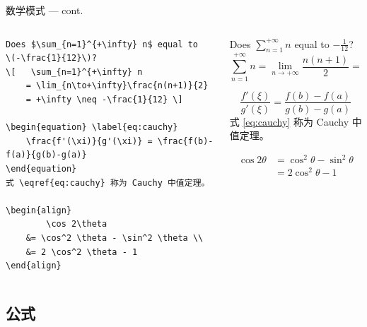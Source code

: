 \begin{frame}[fragile]{数学模式 --- cont.} \label{math-examples}
  \begin{columns}
      \begin{column}{0.5\textwidth}
          \begin{verbatim}
Does $\sum_{n=1}^{+\infty} n$ equal to
\(-\frac{1}{12}\)?
\[   \sum_{n=1}^{+\infty} n
    = \lim_{n\to+\infty}\frac{n(n+1)}{2}
    = +\infty \neq -\frac{1}{12} \]

\begin{equation} \label{eq:cauchy}
    \frac{f'(\xi)}{g'(\xi)} = \frac{f(b)-f(a)}{g(b)-g(a)}
\end{equation}
式 \eqref{eq:cauchy} 称为 Cauchy 中值定理。

\begin{align}
        \cos 2\theta
    &= \cos^2 \theta - \sin^2 \theta \\
    &= 2 \cos^2 \theta - 1
\end{align}
          \end{verbatim}
      \end{column}
      \begin{column}{0.48\textwidth}\small
  Does $\sum_{n=1}^{+\infty} n$ equal to
  \(-\frac{1}{12}\)?
  \[   \sum_{n=1}^{+\infty} n
     = \lim_{n\to+\infty}\frac{n(n+1)}{2}
     = +\infty \neq -\frac{1}{12} \]
  
  \begin{equation} \label{eq:cauchy}
      \frac{f'(\xi)}{g'(\xi)} = \frac{f(b)-f(a)}{g(b)-g(a)}
  \end{equation}
  式 \eqref{eq:cauchy} 称为 Cauchy 中值定理。
  
  \begin{align}
         \cos 2\theta
      &= \cos^2 \theta - \sin^2 \theta \\
      &= 2 \cos^2 \theta - 1
  \end{align}
      \end{column}
  \end{columns}
\end{frame}

\subsection{公式}

